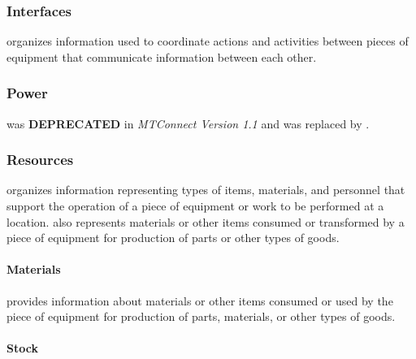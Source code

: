 \FloatBarrier

\subsubsection{Interfaces}
\label{sec:Interfaces}



 organizes information used to coordinate actions and activities between pieces of equipment that communicate information between each other.

\FloatBarrier

\subsubsection{Power}
\label{sec:Power}



 was \textbf{DEPRECATED} in \textit{MTConnect Version 1.1} and was replaced by .

\FloatBarrier

\subsubsection{Resources}
\label{sec:Resources}



 organizes information representing types of items, materials, and personnel that support the operation of a piece of equipment or work to be performed at a location.  also represents materials or other items consumed or transformed by a piece of equipment for production of parts or other types of goods.

\FloatBarrier

\paragraph{Materials}\mbox{}
\label{sec:Materials}



 provides information about materials or other items consumed or used by the piece of equipment for production of parts, materials, or other types of goods.


\paragraph{Stock}\mbox{}
\label{sec:Stock}



